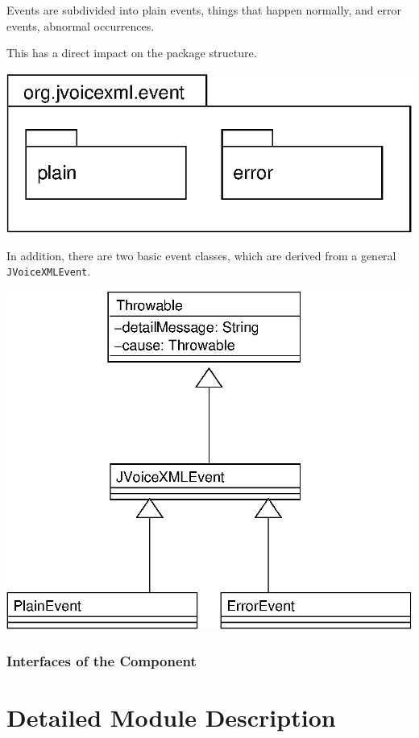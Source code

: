 \documentclass[11pt,a4paper]{article}
\begin{document}
Events are subdivided into plain events, things that happen normally, and
error events, abnormal occurrences.

This has a direct impact on the package structure.

\begin{center}
\includegraphics{package-org.jvoicexml.event.eps}
\end{center}

In addition, there are two basic event classes, which are derived from
a general \texttt{JVoiceXMLEvent}.

\begin{center}
\includegraphics[scale=0.6]{class-event.eps}
\end{center}

\subsubsection{Interfaces of the Component}

\section{Detailed Module Description}
\label{sec:deta-module-descr}
\end{document}
